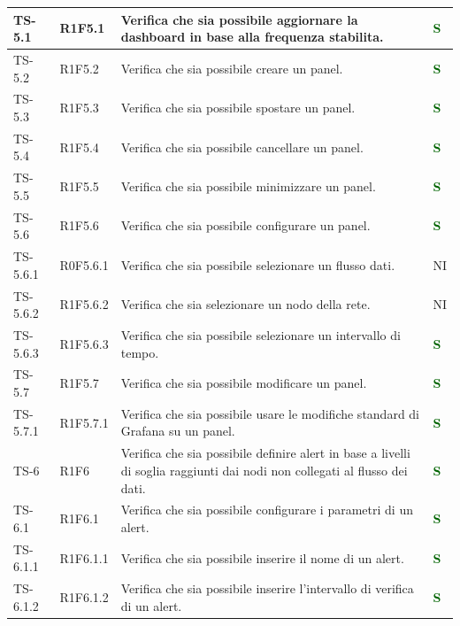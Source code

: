 \begin{longtable}{|C{2.5cm}|C{2.5cm}|C{6.5cm}|C{1.5cm}|}
			{TS-5.1} & {R1F5.1} & Verifica che sia possibile aggiornare la
			dashboard in base alla frequenza
			stabilita. & \textcolor{darkgreen}{\textbf{S}}\\
			\hline
			{TS-5.2} & {R1F5.2} & Verifica che sia possibile creare un panel. & \textcolor{darkgreen}{\textbf{S}}\\
			\hline
			{TS-5.3} & {R1F5.3} & Verifica che sia possibile spostare un
			panel. & \textcolor{darkgreen}{\textbf{S}}\\
			\hline
			{TS-5.4} & {R1F5.4} & Verifica che sia possibile cancellare un
			panel. & \textcolor{darkgreen}{\textbf{S}}\\
			\hline
			{TS-5.5} & {R1F5.5} & Verifica che sia possibile minimizzare un
			panel. & \textcolor{darkgreen}{\textbf{S}}\\
			\hline
			{TS-5.6} & {R1F5.6} & Verifica che sia possibile configurare un
			panel. & \textcolor{darkgreen}{\textbf{S}}\\
			\hline
			{TS-5.6.1} & {R0F5.6.1} & Verifica che sia possibile selezionare un
			flusso dati. & {NI}\\
			\hline
			{TS-5.6.2} & {R1F5.6.2} & Verifica che sia selezionare un
			nodo della rete. & {NI}\\
			\hline
			{TS-5.6.3} & {R1F5.6.3} & Verifica che sia possibile selezionare un
			intervallo di tempo.  & \textcolor{darkgreen}{\textbf{S}}\\
			\hline
			{TS-5.7} & {R1F5.7} & Verifica che sia possibile modificare un
			panel.  & \textcolor{darkgreen}{\textbf{S}}\\
			\hline
			{TS-5.7.1} & {R1F5.7.1} & Verifica che sia possibile usare le
			modifiche standard di Grafana su un
			panel. & \textcolor{darkgreen}{\textbf{S}}\\
			\hline
			{TS-6} & {R1F6} & Verifica che sia  possibile definire alert in
			base a livelli di soglia raggiunti dai
			nodi non collegati al flusso dei dati.  & \textcolor{darkgreen}{\textbf{S}}\\
			\hline
			{TS-6.1} & {R1F6.1} & Verifica che sia possibile configurare i
			parametri di un alert.  & \textcolor{darkgreen}{\textbf{S}}\\
			\hline
			{TS-6.1.1} & {R1F6.1.1} & Verifica che sia possibile inserire il nome
			di un alert.  & \textcolor{darkgreen}{\textbf{S}}\\
			\hline
			{TS-6.1.2} & {R1F6.1.2} & Verifica che sia  possibile inserire
			l'intervallo di verifica di un alert.  & \textcolor{darkgreen}{\textbf{S}}\\

\end{longtable}
